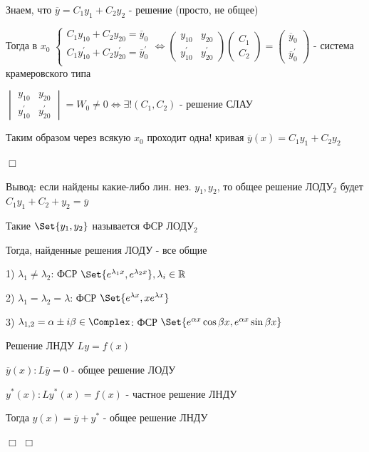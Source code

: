 \documentclass[12pt]{article}
\begin{document}
    Знаем, что $\overline{y} = C_1 y_1 + C_2 y_2$ - решение (просто, не общее)

    Тогда в $x_0$ $\begin{cases}
                       C_1 y_{10} + C_2 y_{20} = \overline{y}_0 \\
                       C_1 y_{10}^\prime + C_2 y_{20}^\prime = \overline{y}_0^\prime \\
    \end{cases} \Longleftrightarrow \begin{pmatrix}y_{10} & y_{20} \\ y_{10}^\prime & y_{20}^\prime \end{pmatrix} \begin{pmatrix}C_1 \\ C_2\end{pmatrix} = \begin{pmatrix}\overline{y}_0 \\ \overline{y}^\prime_0\end{pmatrix}$ -
    система крамеровского типа

    $\begin{vmatrix}y_{10} & y_{20} \\ y^\prime_{10} & y^\prime_{20}\end{vmatrix} = W_0 \neq 0 \Longleftrightarrow \exists! (C_1, C_2)$ - решение СЛАУ

    Таким образом через всякую $x_0$ проходит одна! кривая $\overline{y}(x) = C_1 y_1 + C_2 y_2$

    $\Box$

    \Nota Вывод: если найдены какие-либо лин. нез. $y_1, y_2$, то общее решение ЛОДУ$_2$ будет $C_1 y_1 + C_2 + y_2 = \overline{y}$

    \Def Такие $\Set{y_1, y_2}$ называется ФСР ЛОДУ$_2$

    \Nota Тогда, найденные решения ЛОДУ - все общие

    1) $\lambda_1 \neq \lambda_2$: ФСР $\Set{e^{\lambda_1 x}, e^{\lambda_2 x}}, \lambda_i \in \Real$

    2) $\lambda_1 = \lambda_2 = \lambda$: ФСР $\Set{e^{\lambda x}, x e^{\lambda x}}$

    3) $\lambda_{1,2} = \alpha \pm i \beta \in \mathbb{\Complex}$: ФСР $\Set{e^{\alpha x} \cos\beta x, e^{\alpha x} \sin \beta x}$

     Решение ЛНДУ $Ly = f(x)$

    $\overline{y}(x): L\overline{y} = 0$ - общее решение ЛОДУ

    $y^*(x): Ly^*(x) = f(x)$ - частное решение ЛНДУ

    Тогда $y(x) = \overline{y} + y^*$ - общее решение ЛНДУ

    $\Box$ \Lab $\Box$
\end{document}
